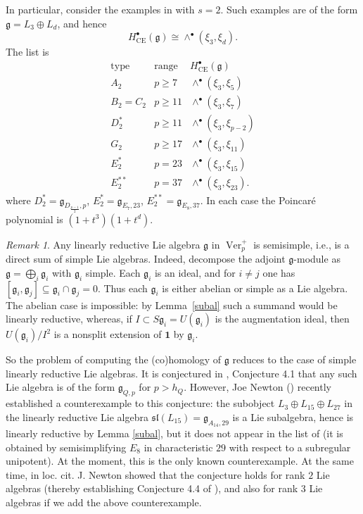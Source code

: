 \documentclass[12pt]{amsart}
\theoremstyle{remark}
\newtheorem{remark}[theorem]{Remark}
\DeclareMathOperator{\Ver}{Ver}
\newcommand{\g}{\mathfrak g}
\newcommand{\one}{\mathbf 1}
\newcommand{\CE}{\mathrm{CE}}
\begin{document}
In particular, consider the examples in \cite[Subsection~4.3]{CEO24} 
with $s=2$. Such examples are of the form 
$\g=L_3\oplus L_d$, and hence
\[
 H^\bullet_{\CE}(\g)\cong\wedge^\bullet(\xi_3,\xi_d).
\]
The list is
\[
\begin{array}{lll}
\text{type} & \text{range} & H^\bullet_{\CE}(\g)\\[2pt]
A_2 & p\geq7 & \wedge^\bullet(\xi_3,\xi_5)\\
B_2=C_2 & p\geq11 & \wedge^\bullet(\xi_3,\xi_7)\\
D_2^* & p\geq11 & \wedge^\bullet(\xi_3,\xi_{p-2})\\
G_2 & p\geq17 & \wedge^\bullet(\xi_3,\xi_{11})\\
E_2^* & p=23 & \wedge^\bullet(\xi_3,\xi_{15})\\
E_2^{**} & p=37 & \wedge^\bullet(\xi_3,\xi_{23}).
\end{array}
\]
where $D_2^*=\g_{D_{\frac{p-1}{2}},p}$, $E_2^*=\g_{E_7,23}$, $E_2^{**}=\g_{E_8,37}$. 
In each case the Poincar\'e polynomial is $(1+t^3)(1+t^d)$.

\begin{remark}\label{rem:simple-reduction} Any linearly reductive Lie algebra $\g$ in $\Ver_p^+$ is semisimple, i.e., is a direct sum of simple Lie algebras.
Indeed, decompose the adjoint $\g$-module as
$\g=\bigoplus_i\g_i$ with $\g_i$ simple.  Each $\g_i$ is an ideal, and for
$i\ne j$ one has $[\g_i,\g_j]\subseteq\g_i\cap\g_j=0$.  Thus each $\g_i$ is
either abelian or simple as a Lie algebra.  The abelian case is impossible:
by Lemma~\ref{subal} such a summand would be linearly reductive, whereas, if
$I\subset S\g_i=U(\g_i)$ is the augmentation ideal, then
$U(\g_i)/I^2$ is a nonsplit extension of $\one$ by $\g_i$.

So the problem of computing the (co)homology of $\g$ reduces to the case of simple linearly reductive Lie algebras. It is conjectured in \cite{CEO24}, Conjecture 4.1 that any such Lie algebra is of the form $\g_{Q,p}$ 
for $p>h_Q$. However, Joe Newton (\cite{Ne}) recently established a counterexample 
to this conjecture: the subobject $L_3\oplus L_{15}\oplus L_{27}$ in the linearly reductive Lie algebra $\mathfrak{sl}(L_{15})=\g_{A_{14},29}$ is a Lie subalgebra, hence is linearly reductive by Lemma \ref{subal}, but it does not appear in the list of \cite[Subsection~4.3]{CEO24} (it is obtained by semisimplifying 
$E_8$ in characteristic $29$ with respect to a subregular unipotent). 
At the moment, this is the only known counterexample.
At the same time, in loc. cit. J. Newton showed that the conjecture holds for rank $2$ Lie algebras (thereby establishing Conjecture 4.4 of \cite{CEO24}), and also for rank $3$ Lie algebras if we add the above counterexample.
\end{remark} 
\end{document}
